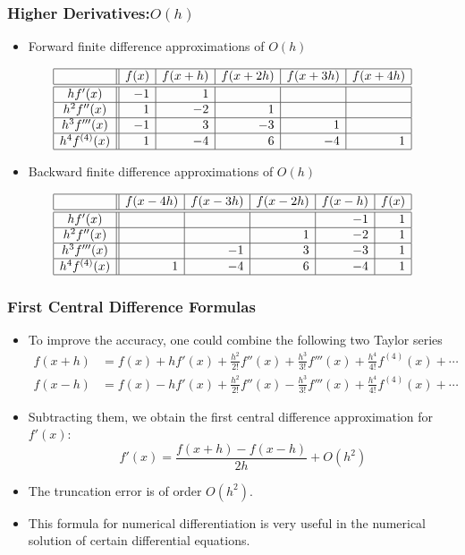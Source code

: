 \documentclass{beamer}
\begin{document}
\begin{frame}[fragile]
\frametitle{Higher Derivatives:$O(h)$}

\begin{itemize}
\item Forward finite difference approximations of $O(h)$
\end{itemize}
\[\begin{array}{|c||r|r|r|r|r|}
  \hline & f(x) & f(x+h) & f(x+2 h) & f(x+3 h) & f(x+4 h) \\
  \hline \hline h f^{\prime}(x) & -1 & 1 & & & \\
  \hline h^2 f^{\prime \prime}(x) & 1 & -2 & 1 & & \\
  \hline h^3 f^{\prime \prime \prime}(x) & -1 & 3 & -3 & 1 & \\
  \hline h^4 f^{(4)}(x) & 1 & -4 & 6 & -4 & 1 \\
  \hline
  \end{array}
\]
\begin{itemize}
\item Backward finite difference approximations of $O(h)$
\end{itemize}
\[
\begin{array}{|c||r|r|r|r|r|}
  \hline & f(x-4 h) & f(x-3 h) & f(x-2 h) & f(x-h) & f(x) \\
  \hline \hline h f^{\prime}(x) & & & & -1 & 1 \\
  \hline h^2 f^{\prime \prime}(x) & & & 1 & -2 & 1 \\
  \hline h^3 f^{\prime \prime \prime}(x) & & -1 & 3 & -3 & 1 \\
  \hline h^4 f^{(4)}(x) & 1 & -4 & 6 & -4 & 1 \\
  \hline
\end{array}
\]


\end{frame}

\begin{frame}[fragile]
\frametitle{First Central Difference Formulas}
\begin{itemize}
\item To improve the accuracy, one could combine the following two Taylor series
\begin{align}
f(x+h)&=f(x)+hf'(x)+\frac{h^2}{2!} f''(x)+ \frac{h^3}{3!} f'''(x)+\frac{h^4}{4!} f^{(4)}(x)+\cdots\nonumber\\
f(x-h)&=f(x)-hf'(x)+\frac{h^2}{2!} f''(x)- \frac{h^3}{3!} f'''(x)+\frac{h^4}{4!} f^{(4)}(x)+\cdots\nonumber
\end{align}
\item Subtracting them, we obtain the \alert{first central difference approximation} for $f'(x)$:
\[
f'(x)=\frac{f(x+h)-f(x-h)}{2h}+O(h^2)
\]
\item The truncation error is of order $O(h^2)$. 
\item This formula for numerical differentiation is very useful in the numerical solution of certain differential equations.
\end{itemize}
\end{frame}
\end{document}
